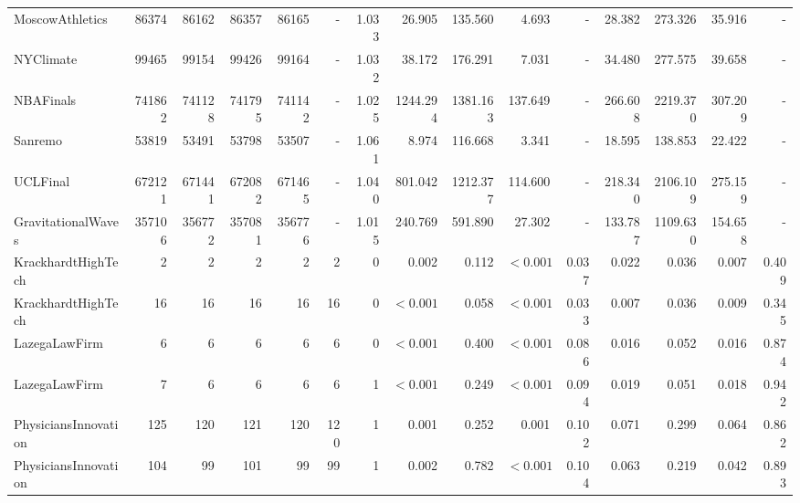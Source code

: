 \begin{table}[!htbp]
\begin{tabular}{lrrrrrrrrrrrrrr}
MoscowAthletics & 86374 & 86162 & 86357 & 86165 & - & 1.033 & 26.905 & 135.560 & 4.693 & - & 28.382 & 273.326 & 35.916 & - \\
NYClimate & 99465 & 99154 & 99426 & 99164 & - & 1.032 & 38.172 & 176.291 & 7.031 & - & 34.480 & 277.575 & 39.658 & - \\
NBAFinals & 741862 & 741128 & 741795 & 741142 & - & 1.025 & 1244.294 & 1381.163 & 137.649 & - & 266.608 & 2219.370 & 307.209 & - \\
Sanremo & 53819 & 53491 & 53798 & 53507 & - & 1.061 & 8.974 & 116.668 & 3.341 & - & 18.595 & 138.853 & 22.422 & - \\
UCLFinal & 672121 & 671441 & 672082 & 671465 & - & 1.040 & 801.042 & 1212.377 & 114.600 & - & 218.340 & 2106.109 & 275.159 & - \\
GravitationalWaves & 357106 & 356772 & 357081 & 356776 & - & 1.015 & 240.769 & 591.890 & 27.302 & - & 133.787 & 1109.630 & 154.658 & - \\
KrackhardtHighTech & 2 & 2 & 2 & 2 & 2 & 0 & 0.002 & 0.112 & $<0.001$ & 0.037 & 0.022 & 0.036 & 0.007 & 0.409 \\
KrackhardtHighTech & 16 & 16 & 16 & 16 & 16 & 0 & $<0.001$ & 0.058 & $<0.001$ & 0.033 & 0.007 & 0.036 & 0.009 & 0.345 \\
LazegaLawFirm & 6 & 6 & 6 & 6 & 6 & 0 & $<0.001$ & 0.400 & $<0.001$ & 0.086 & 0.016 & 0.052 & 0.016 & 0.874 \\
LazegaLawFirm & 7 & 6 & 6 & 6 & 6 & 1 & $<0.001$ & 0.249 & $<0.001$ & 0.094 & 0.019 & 0.051 & 0.018 & 0.942 \\
PhysiciansInnovation & 125 & 120 & 121 & 120 & 120 & 1 & 0.001 & 0.252 & 0.001 & 0.102 & 0.071 & 0.299 & 0.064 & 0.862 \\
PhysiciansInnovation & 104 & 99 & 101 & 99 & 99 & 1 & 0.002 & 0.782 & $<0.001$ & 0.104 & 0.063 & 0.219 & 0.042 & 0.893 \\
\bottomrule
\end{tabular}
\end{table}
